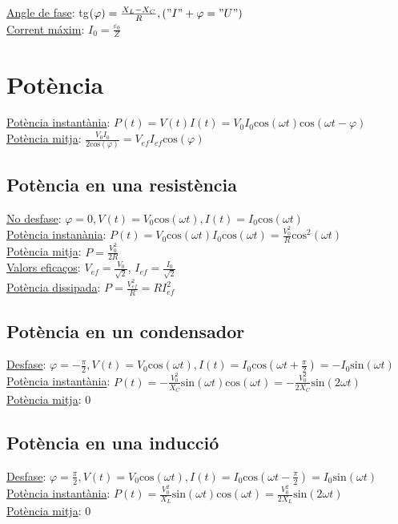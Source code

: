 \documentclass[12pt]{article}
\begin{document}
\begin{multicols}{5}
\underline{Angle de fase}: tg$(\varphi)=\frac{X_L-X_C}{R}, ("I" + \varphi = "U")$ \\
\underline{Corrent máxim}: $I_0 = \frac{\varepsilon_0}{Z}$

\section{Potència}

\underline{Potència instantània}: $P(t) = V(t)I(t) = V_0I_0\text{cos}(\omega t)\text{cos}(\omega t - \varphi)$ \\
\underline{Potència mitja}: $\frac{V_0I_0}{2\text{cos}(\varphi)} = V_{ef}I_{ef}\text{cos}(\varphi)$

\subsection{Potència en una resistència}

\underline{No desfase}: $\varphi = 0, V(t) = V_0\text{cos}(\omega t), I(t) = I_0\text{cos}(\omega t)$ \\
\underline{Potència instanània}: $P(t) = V_0\text{cos}(\omega t)I_0\text{cos}(\omega t) = \frac{V_0^2}{R}\text{cos}^2(\omega t)$ \\
\underline{Potència mitja}: $P = \frac{V_0^2}{2R}$ \\
\underline{Valors eficaços}: $V_{ef} = \frac{V_0}{\sqrt{2}}$, $I_{ef} = \frac{I_0}{\sqrt{2}}$ \\
\underline{Potència dissipada}: $P = \frac{V_{ef}^2}{R} = RI_{ef}^2$

\subsection{Potència en un condensador}

\underline{Desfase}: $\varphi = -\frac{\pi}{2}, V(t) = V_0\text{cos}(\omega t), I(t) = I_0\text{cos}(\omega t + \frac{\pi}{2}) = -I_0\text{sin}(\omega t)$ \\
\underline{Potència instantània}: $P(t) = -\frac{V_0^2}{X_C}\text{sin}(\omega t)\text{cos}(\omega t) = -\frac{V_0^2}{2X_C}\text{sin}(2\omega t)$ \\
\underline{Potència mitja}: 0

\subsection{Potència en una inducció}

\underline{Desfase}: $\varphi = \frac{\pi}{2}, V(t) = V_0\text{cos}(\omega t), I(t) = I_0\text{cos}(\omega t - \frac{\pi}{2}) = I_0\text{sin}(\omega t)$ \\
\underline{Potència instantània}: $P(t) = \frac{V_0^2}{X_L}\text{sin}(\omega t)\text{cos}(\omega t) = \frac{V_0^2}{2X_L}\text{sin}(2\omega t)$ \\
\underline{Potència mitja}: 0


\end{multicols}
\end{document}

